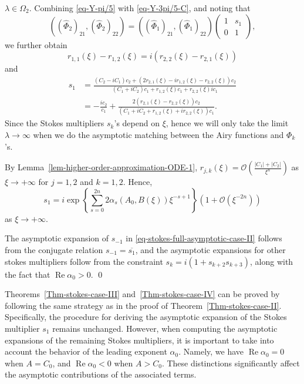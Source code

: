 \documentclass[12pt]{article}
\theoremstyle{plain}
\theoremstyle{definition}
\newtheorem{remark}{\hskip\parindent Remark}
\numberwithin{equation}{section}
\renewcommand\Re{\operatorname{Re}}
\begin{document}
$\lambda\in\Omega_{2}$.
Combining \eqref{eq-Y-pi/5} with \eqref{eq-Y-3pi/5-C}, and noting that
$$\left((\widehat{\Phi}_{2})_{21},(\widehat{\Phi}_{2})_{22}\right)=\left((\widehat{\Phi}_{1})_{21},(\widehat{\Phi}_{1})_{22}\right)\left(\begin{matrix}1&s_{1}\\0&1\end{matrix}\right),$$
we further obtain
\begin{equation}
r_{1,1}(\xi)-r_{1,2}(\xi)=i(r_{2,2}(\xi)-r_{2,1}(\xi))
\end{equation}
and
\begin{equation}
\begin{split}
s_{1}&=\frac{(C_{2}-iC_{1})c_{2}+(2r_{2,1}(\xi)-ir_{1,2}(\xi)-r_{2,2}(\xi))c_{2}}{(C_{1}+iC_{2})c_{1}+r_{1,2}(\xi)c_{1}+r_{2,2}(\xi)ic_{1}}\\
&=-\frac{ic_{2}}{c_{1}}+\frac{2(r_{2,1}(\xi)-r_{2,2}(\xi))c_{2}}{(C_{1}+iC_{2}+r_{1,2}(\xi)+ir_{2,2}(\xi))c_{1}}.
\end{split}
\end{equation}
Since the Stokes multipliers $s_{k}$'s depend on $\xi$,
hence we will only take the limit $\lambda\to\infty$
when we do the asymptotic matching between the Airy functions and $\Phi_{k}$'s.


By Lemma~\ref{lem-higher-order-approximation-ODE-1}, $r_{j,k}(\xi)=\mathcal{O}\left(\frac{|C_{1}|+|C_{2}|}{\xi^{n}}\right)$ as $\xi\to+\infty$ for $j=1,2$ and $k=1,2$. Hence,
\begin{equation}
s_{1}=i \exp\left\{\sum\limits_{s=0}^{2n}2\alpha_{s}(A_{0},B(\xi))\xi^{-s+1}\right\}\left(1+\mathcal{O}(\xi^{-2n})\right)
\end{equation}
as $\xi\to+\infty$.


The asymptotic expansion of $s_{-1}$ in \eqref{eq-stokes-full-asymptotic-case-II}
follows from the conjugate relation $s_{-1}=\overline{s_{1}}$, and the asymptotic expansions for other stokes multipliers follow from the constraint $s_{k}=i(1+s_{k+2}s_{k+3})$, along with the fact that $\Re\alpha_{0}>0$. \qed



\begin{remark}
Theorems~\ref{Thm-stokes-case-III} and~\ref{Thm-stokes-case-IV} can be proved by following the same strategy as in the proof of Theorem~\ref{Thm-stokes-case-II}. Specifically, the procedure for deriving the asymptotic expansion of the Stokes multiplier $s_{1}$ remains unchanged. However, when computing the asymptotic expansions of the remaining Stokes multipliers, it is important to take into account the behavior of the leading exponent $\alpha_{0}$. Namely, we have $\Re \alpha_{0} = 0$ when $A = C_{0}$, and $\Re \alpha_{0} < 0$ when $A> C_{0}$. These distinctions significantly affect the asymptotic contributions of the associated terms.
\end{remark}
\end{document}
